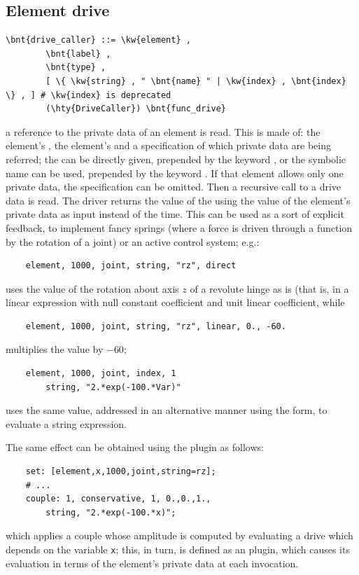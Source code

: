 \subsection{Element drive}\label{sec:DriveCaller:ELEMENT}
\begin{Verbatim}[commandchars=\\\{\}]
    \bnt{drive_caller} ::= \kw{element} ,
        \bnt{label} ,
        \bnt{type} ,
        [ \{ \kw{string} , " \bnt{name} " | \kw{index} , \bnt{index} \} , ] # \kw{index} is deprecated
        (\hty{DriveCaller}) \bnt{func_drive}
\end{Verbatim}
a reference to the private data of an element is read.
This is made of: the element's , the element's 
and a specification of which private data are being referred;
the  can be directly given, prepended by the keyword
, or the symbolic name  can be used, prepended by 
the keyword .
If that element allows only one private data, the specification 
can be omitted.
Then a recursive call to a drive data is read. 
The driver returns the value of the  
 using the value of the 
element's private data as input instead of the time. 
This can be used as a sort of explicit feedback, to implement fancy
springs (where a force is driven through a function by the rotation
of a joint) or an active control system; e.g.:
\begin{verbatim}
    element, 1000, joint, string, "rz", direct
\end{verbatim}
uses the value of the rotation about axis $z$ of a revolute hinge
as is (that is, in a linear expression with null constant coefficient 
and unit linear coefficient, while
\begin{verbatim}
    element, 1000, joint, string, "rz", linear, 0., -60.
\end{verbatim}
multiplies the value by $-60$;
\begin{verbatim}
    element, 1000, joint, index, 1
        string, "2.*exp(-100.*Var)"
\end{verbatim}
uses the same value, addressed in an alternative manner using the  form, to evaluate
a string expression.

The same effect can be obtained using the  plugin as follows:
\begin{verbatim}
    set: [element,x,1000,joint,string=rz];
    # ...
    couple: 1, conservative, 1, 0.,0.,1.,
        string, "2.*exp(-100.*x)";
\end{verbatim}
which applies a couple whose amplitude is computed by evaluating
a  drive which depends on the variable \texttt{x}; this, in turn,
is defined as an  plugin, which causes its evaluation
in terms of the element's private data at each invocation.


